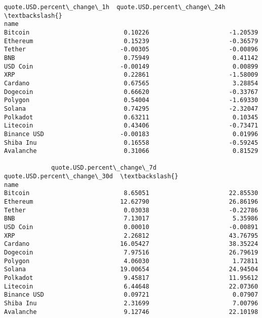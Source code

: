 \documentclass[11pt]{article}
\makeatletter
\newcommand{\boxspacing}{\kern\kvtcb@left@rule\kern\kvtcb@boxsep}
\newcommand{\prompt}[4]{
        {\ttfamily\llap{{\color{#2}[#3]:\hspace{3pt}#4}}\vspace{-\baselineskip}}
    }
\makeatother
\begin{document}
            \begin{tcolorbox}[breakable, size=fbox, boxrule=.5pt, pad at break*=1mm, opacityfill=0]
\prompt{Out}{outcolor}{50}{\boxspacing}
\begin{Verbatim}[commandchars=\\\{\}]
             quote.USD.percent\_change\_1h  quote.USD.percent\_change\_24h  \textbackslash{}
name
Bitcoin                          0.10226                      -1.20539
Ethereum                         0.15239                      -0.36579
Tether                          -0.00305                      -0.00896
BNB                              0.75949                       0.41142
USD Coin                        -0.00149                       0.00899
XRP                              0.22861                      -1.58009
Cardano                          0.67565                       3.28854
Dogecoin                         0.66620                      -0.33767
Polygon                          0.54004                      -1.69330
Solana                           0.74295                      -2.32047
Polkadot                         0.63211                       0.10345
Litecoin                         0.43406                      -0.73471
Binance USD                     -0.00183                       0.01996
Shiba Inu                        0.16558                      -0.59245
Avalanche                        0.31066                       0.81529

             quote.USD.percent\_change\_7d  quote.USD.percent\_change\_30d  \textbackslash{}
name
Bitcoin                          8.65051                      22.85530
Ethereum                        12.62790                      26.86196
Tether                           0.03038                      -0.22786
BNB                              7.13017                       5.35986
USD Coin                         0.00010                      -0.00891
XRP                              2.26812                      43.76795
Cardano                         16.05427                      38.35224
Dogecoin                         7.97516                      26.79619
Polygon                          4.06030                       1.72811
Solana                          19.00654                      24.94504
Polkadot                         9.45817                      11.95612
Litecoin                         6.44648                      22.07360
Binance USD                      0.09721                       0.07907
Shiba Inu                        2.31699                       7.00796
Avalanche                        9.12746                      22.10198


\end{Verbatim}
\end{tcolorbox}
\end{document}
